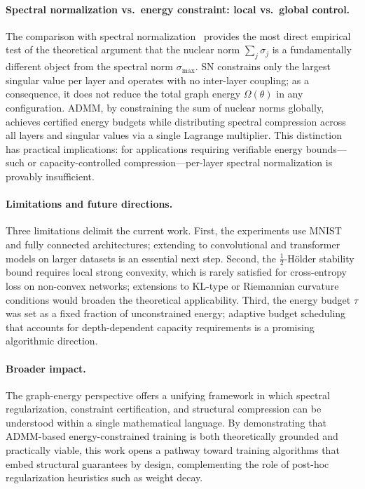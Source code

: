 \documentclass[a4paper,fleqn]{cas-sc}
\theoremstyle{remark}
\theoremstyle{definition}
\begin{document}
\paragraph{Spectral normalization vs.\ energy constraint: local vs.\ global control.}
The comparison with spectral normalization~\cite{Miyato2018SpectralNorm} provides the most direct empirical test of the theoretical argument that the nuclear norm $\sum_j\sigma_j$ is a fundamentally different object from the spectral norm $\sigma_{\max}$. SN constrains only the largest singular value per layer and operates with no inter-layer coupling; as a consequence, it does not reduce the total graph energy $\Omega(\theta)$ in any configuration. ADMM, by constraining the sum of nuclear norms globally, achieves certified energy budgets while distributing spectral compression across all layers and singular values via a single Lagrange multiplier. This distinction has practical implications: for applications requiring verifiable energy bounds---such or capacity-controlled compression---per-layer spectral normalization is provably insufficient.

\paragraph{Limitations and future directions.}
Three limitations delimit the current work. First, the experiments use MNIST and fully connected architectures; extending to convolutional and transformer models on larger datasets is an essential next step. Second, the $\frac{1}{2}$-Hölder stability bound requires local strong convexity, which is rarely satisfied for cross-entropy loss on non-convex networks; extensions to KL-type or Riemannian curvature conditions would broaden the theoretical applicability. Third, the energy budget $\tau$ was set as a fixed fraction of unconstrained energy; adaptive budget scheduling that accounts for depth-dependent capacity requirements is a promising algorithmic direction.

\paragraph{Broader impact.}
The graph-energy perspective offers a unifying framework in which spectral regularization, constraint certification, and structural compression can be understood within a single mathematical language. By demonstrating that ADMM-based energy-constrained training is both theoretically grounded and practically viable, this work opens a pathway toward training algorithms that embed structural guarantees by design, complementing the role of post-hoc regularization heuristics such as weight decay.
\end{document}
